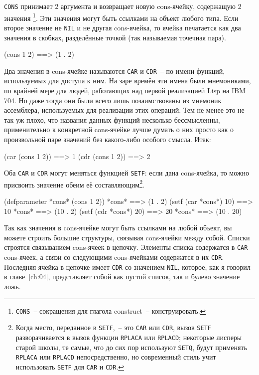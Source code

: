 \lstinline{CONS} принимает 2 аргумента и возвращает новую cons-ячейку, содержащую 2 значения
\footnote{\lstinline{CONS}~-- сокращения для глагола construct~-- конструировать.}\hspace{\footnotenegspace}. Эти значения
могут быть ссылками на объект любого типа. Если второе значение не \lstinline{NIL} и не другая
cons-ячейка, то ячейка печатается как два значения в скобках, разделённые точкой (так
называемая точечная пара).

\begin{myverb}
(cons 1 2) ==> (1 . 2)
\end{myverb}

Два значения в cons-ячейке называются \lstinline{CAR} и \lstinline{CDR}~-- по имени функций,
используемых для доступа к ним. На заре времён эти имена были мнемониками, по крайней мере
для людей, работающих над первой реализацией Lisp на IBM 704. Но даже тогда они были всего
лишь позаимствованы из мнемоник ассемблера, используемых для реализации этих операций. Тем
не менее это не так уж плохо, что названия данных функций несколько бессмысленны,
применительно к конкретной cons-ячейке лучше думать о них просто как о произвольной паре
значений без какого-либо особого смысла. Итак:

\begin{myverb}
(car (cons 1 2)) ==> 1
(cdr (cons 1 2)) ==> 2
\end{myverb}

Оба \lstinline{CAR} и \lstinline{CDR} могут меняться функцией \lstinline{SETF}: если дана cons-ячейка, то
можно присвоить значение обеим её составляющим\footnote{Когда место, переданное в
  \lstinline{SETF},~-- это \lstinline{CAR} или \lstinline{CDR}, вызов \lstinline{SETF} разворачивается в вызов
  функции \lstinline{RPLACA} или \lstinline{RPLACD}; некоторые лисперы старой школы, те самые, что
  до сих пор используют \lstinline{SETQ}, будут применять \lstinline{RPLACA} или \lstinline{RPLACD}
  непосредственно, но современный стиль учит использовать \lstinline{SETF} для \lstinline{CAR} и
  \lstinline{CDR}.}\hspace{\footnotenegspace}.

\begin{myverb}
(defparameter *cons* (cons 1 2))
*cons*                 ==> (1 . 2)
(setf (car *cons*) 10) ==> 10
*cons*                 ==> (10 . 2)
(setf (cdr *cons*) 20) ==> 20
*cons*                 ==> (10 . 20)
\end{myverb}

Так как значения в cons-ячейке могут быть ссылками на любой объект, вы можете строить большие
структуры, связывая cons-ячейки между собой. Списки строятся связыванием cons-ячеек в
цепочку. Элементы списка содержатся в \lstinline{CAR} cons-ячеек, а связи со следующими
cons-ячейками содержатся в их \lstinline{CDR}. Последняя ячейка в цепочке имеет \lstinline{CDR} со
значением \lstinline{NIL}, которое, как я говорил в главе~\ref{ch:04}, представляет собой как
пустой список, так и булево значение ложь.

